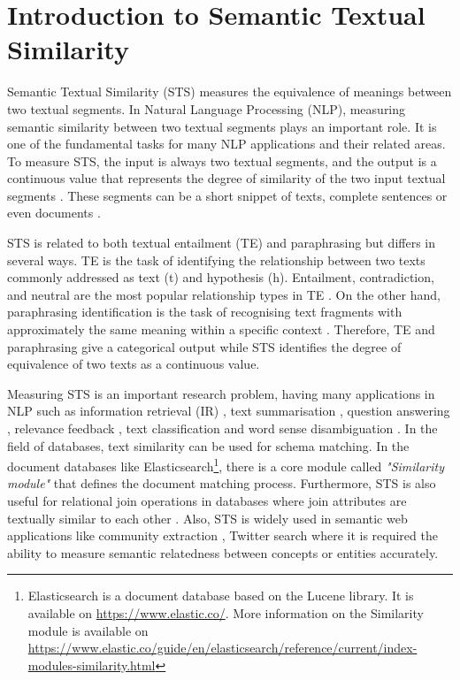 \chapter{\label{cha:sts_introduction}Introduction to Semantic Textual Similarity}

Semantic Textual Similarity (STS) measures the equivalence of meanings between two textual segments. In Natural Language Processing (NLP), measuring semantic similarity between two textual segments plays an important role. It is one of the fundamental tasks for many NLP applications and their related areas. To measure STS, the input is always two textual segments, and the output is a continuous value that represents the degree of similarity of the two input textual segments \autocite{agirre-etal-2012-semeval}. These segments can be a short snippet of texts, complete sentences or even documents \autocite{agirre-etal-2013-sem}.

STS is related to both textual entailment (TE) and paraphrasing but differs in several ways. TE is the task of identifying the relationship between two texts commonly addressed as text (t) and hypothesis (h). Entailment, contradiction, and neutral are the most popular relationship types in TE \autocite{10.1007/11736790_9,marelli-etal-2014-semeval}. On the other hand, paraphrasing identification is the task of recognising text fragments with approximately the same meaning within a specific context \autocite{info11050241}. Therefore, TE and paraphrasing give a categorical output while STS identifies the degree of equivalence of two texts as a continuous value. 

Measuring STS is an important research problem, having many applications in NLP such as information retrieval (IR) \autocite{10.1145/1097047.1097051, 5571521}, text summarisation \autocite{ALIGULIYEV20097764, SCHALLEHN2004361}, question answering \autocite{mohler-etal-2011-learning}, relevance feedback \autocite{WANG2020102342}, text classification \autocite{10.1007/978-3-642-41278-3_74, 10.1007/978-3-319-11749-2_8} and word sense disambiguation \autocite{10.1007/978-3-642-17432-2_44}. In the field of databases, text similarity can be used for schema matching. In the document databases like Elasticsearch\footnote{Elasticsearch is a document database based on the Lucene library. It is available on \url{https://www.elastic.co/}. More information on the Similarity module is available on \url{https://www.elastic.co/guide/en/elasticsearch/reference/current/index-modules-similarity.html}}, there is a core module called \textit{"Similarity module"} that defines the document matching process. Furthermore, STS is also useful for relational join operations in databases where join attributes are textually similar to each other \autocite{10.1145/352595.352598, SCHALLEHN2004361}. Also, STS is widely used in semantic web applications like community extraction \autocite{10.1007/978-3-642-14589-6_33}, Twitter search \autocite{feng-etal-2013-twitter} where it is required the ability to measure semantic relatedness between concepts or entities accurately.
 
